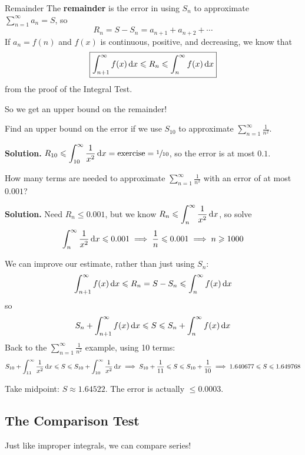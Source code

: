 \begin{Definition}{Remainder}{}
    The \textbf{remainder} is the error in using $ S_n $ to approximate $ \sum\limits_{n=1}^{\infty} a_n=S $,
    so
    \[ R_n=S-S_n=a_{n+1}+a_{n+2}+\cdots \]
    If $ a_n=f(n) $ and $ f(x) $ is continuous, positive, and decreasing, we know that
    \[ \boxed{\int_{n+1}^{\infty} f(x)\odif{x} \leqslant R_n\leqslant \int_{n}^{\infty} f(x)\odif{x}} \]
    from the proof of the Integral Test.
\end{Definition}
So we get an upper bound on the remainder!

\begin{Example}{}{}
    Find an upper bound on the error if we use $ S_{10} $ to approximate
    $ \displaystyle\sum\limits_{n=1}^{\infty} \frac{1}{n^2}  $.

    \textbf{Solution.} $ \displaystyle R_{10}\leqslant \int_{10}^{\infty}\frac{1}{x^2}  \odif{x}=
        \text{exercise}=\sfrac{1}{10} $, so the error is at most $ 0.1 $.
\end{Example}

\begin{Example}{}{}
    How many terms are needed to approximate $ \displaystyle \sum\limits_{n=1}^{\infty} \frac{1}{n^2}  $
    with an error of at most $ 0.001 $?

    \textbf{Solution.} Need $ R_n\leqslant 0.001 $, but we know $
        \displaystyle R_n\leqslant \int_{n}^{\infty}
        \frac{1}{x^2} \odif{x} $, so solve
    \[ \int_{n}^{\infty} \frac{1}{x^2} \odif{x} \leqslant 0.001\implies
        \frac{1}{n} \leqslant 0.001\implies n\geqslant 1000 \]
\end{Example}

We can improve our estimate, rather than just using $ S_n $:
\[ \int_{n+1}^{\infty} f(x)\odif{x} \leqslant R_n=S-S_n\leqslant \int_{n}^{\infty} f(x)\odif{x} \]
so
\[ S_n+\int_{n+1}^{\infty} f(x)\odif{x} \leqslant S\leqslant S_n+\int_{n}^{\infty} f(x)\odif{x} \]
Back to the $ \displaystyle \sum\limits_{n=1}^{\infty} \frac{1}{n^2} $ example, using 10 terms:
\[ S_{10}+\int_{11}^{\infty} \frac{1}{x^2} \odif{x} \leqslant S\leqslant S_{10}+\int_{10}^{\infty}
    \frac{1}{x^2} \odif{x}
    \implies S_{10}+\frac{1}{11} \leqslant S\leqslant S_{10}+\frac{1}{10} \implies
    1.640677\leqslant S\leqslant 1.649768  \]

Take midpoint: $ S\approx 1.64522 $. The error is actually $ \leqslant 0.0003 $.

\subsection*{The Comparison Test}
Just like improper integrals, we can compare series!

